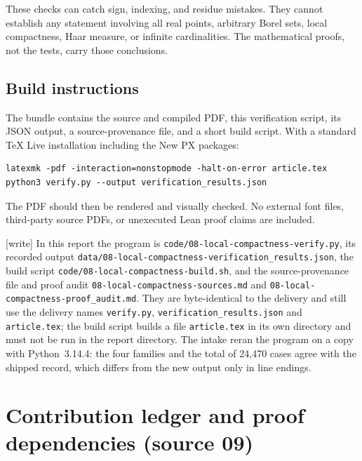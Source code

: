 \documentclass[11pt]{article}
\numberwithin{equation}{section}
\theoremstyle{definition}
\theoremstyle{remark}
\newcommand{\writetag}{\textup{\textsf{\small[write]}}}
\newcommand{\fn}[1]{\nolinkurl{#1}}
\begin{document}
These checks can catch sign, indexing, and residue mistakes. They cannot
establish any statement involving all real points, arbitrary Borel sets,
local compactness, Haar measure, or infinite cardinalities. The mathematical
proofs, not the tests, carry those conclusions.

\subsection{Build instructions}
The bundle contains the source and compiled PDF, this verification script,
its JSON output, a source-provenance file, and a short build script. With
a standard TeX Live installation including the New PX packages:
\begin{verbatim}
latexmk -pdf -interaction=nonstopmode -halt-on-error article.tex
python3 verify.py --output verification_results.json
\end{verbatim}
The PDF should then be rendered and visually checked. No external font
files, third-party source PDFs, or unexecuted Lean proof claims are included.

\noindent\writetag{} In this report the program is
\fn{code/08-local-compactness-verify.py}, its recorded output
\fn{data/08-local-compactness-verification_results.json}, the build script
\fn{code/08-local-compactness-build.sh}, and the source-provenance file and
proof audit \fn{08-local-compactness-sources.md} and
\fn{08-local-compactness-proof_audit.md}. They are byte-identical to the
delivery and still use the delivery names \fn{verify.py},
\fn{verification_results.json} and \fn{article.tex}; the build script builds a
file \fn{article.tex} in its own directory and must not be run in the report
directory. The intake reran the program on a copy with Python~3.14.4: the
four families and the total of 24{,}470 cases agree with the shipped record,
which differs from the new output only in line endings.

\section{Contribution ledger and proof dependencies (source 09)}
\label{pma:ser:app:ledger}
\end{document}
